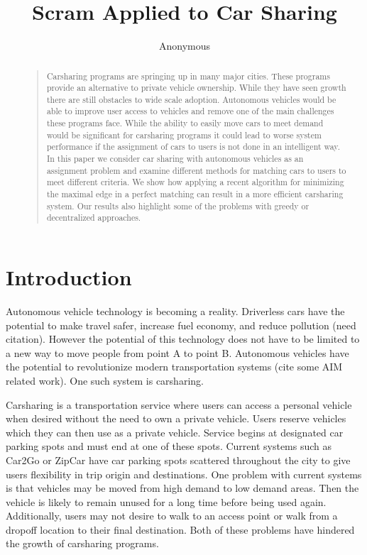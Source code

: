 \documentclass[letterpaper]{article}
\begin{document}
%
\title{Scram Applied to Car Sharing}
\author{Anonymous}
\maketitle
\begin{abstract}
\begin{quote}
Carsharing programs are springing up in many major cities. These programs provide an alternative to private vehicle ownership. While they have seen growth there are still obstacles to wide scale adoption. Autonomous vehicles would be able to improve user access to vehicles and remove one of the main challenges these programs face. While the ability to easily move cars to meet demand would be significant for carsharing programs it could lead to worse system performance if the assignment of cars to users is not done in an intelligent way. In this paper we consider car sharing with autonomous vehicles as an assignment problem and examine different methods for matching cars to users to meet different criteria. We show how applying a recent algorithm for minimizing the maximal edge in a perfect matching can result in a more efficient carsharing system. Our results also highlight some of the problems with greedy or decentralized approaches.
\end{quote}
\end{abstract}

\noindent 

\section{Introduction}
Autonomous vehicle technology is becoming a reality. Driverless cars have the potential to make travel safer, increase fuel economy, and reduce pollution (need citation). However the potential of this technology does not have to be limited to a new way to move people from point A to point B. Autonomous vehicles have the potential to revolutionize modern transportation systems (cite some AIM related work). One such system is carsharing.

Carsharing is a transportation service where users can access a personal vehicle when desired without the need to own a private vehicle. Users reserve vehicles which they can then use as a private vehicle. Service begins at designated car parking spots and must end at one of these spots. Current systems such as Car2Go or ZipCar have car parking spots scattered throughout the city to give users flexibility in trip origin and destinations. One problem with current systems is that vehicles may be moved from high demand to low demand areas. Then the vehicle is likely to remain unused for a long time before being used again. Additionally, users may not desire to walk to an access point or walk from a dropoff location to their final destination. Both of these problems have hindered the growth of carsharing programs.
\end{document}
